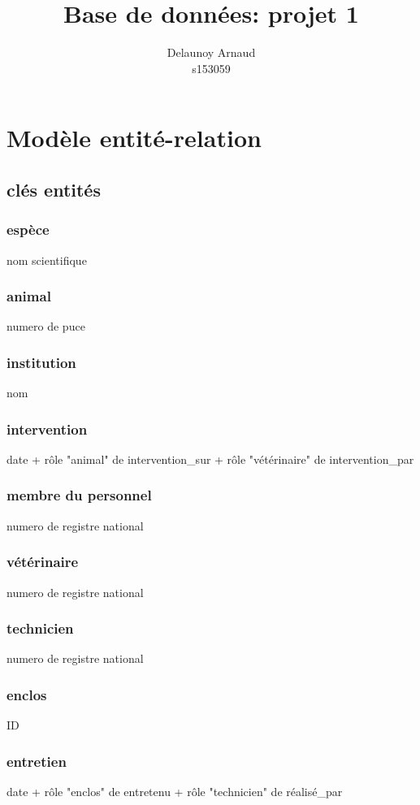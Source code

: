 \documentclass[11pt]{article}
\title{Base de données: projet 1}
\author{Delaunoy Arnaud \\ s153059}
\date{}
\begin{document}
\begin{titlepage}
\maketitle
\setcounter{page}{0}
\thispagestyle{empty}
\end{titlepage}
\section{Modèle entité-relation}
\subsection{clés entités}
\subsubsection{espèce}
nom scientifique
\subsubsection{animal}
numero de puce
\subsubsection{institution}
nom
\subsubsection{intervention}
date + rôle "animal" de intervention\_sur + rôle "vétérinaire" de intervention\_par
\subsubsection{membre du personnel}
numero de registre national
\subsubsection{vétérinaire}
numero de registre national
\subsubsection{technicien}
numero de registre national
\subsubsection{enclos}
ID
\subsubsection{entretien}
date + rôle "enclos" de entretenu + rôle "technicien" de réalisé\_par
\end{document}
